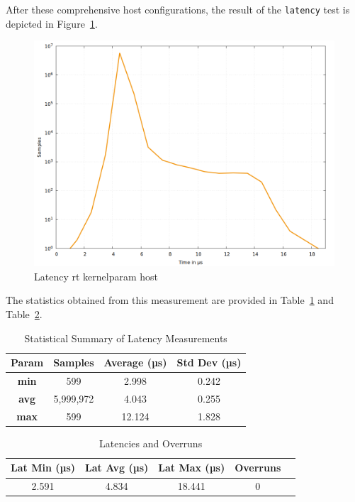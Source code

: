 \documentclass[MMR,Master,english]{twbook}
\begin{document}
\clearpage

\noindent After these comprehensive host configurations, the result of the \texttt{latency} test is depicted in Figure~\ref{fig:max_latency_rt_kernelparam_host}.

\begin{figure}[H]
	\centering
	\includegraphics[width=0.7\columnwidth]{masterthesis-documentation/docs/sigmatek/xenomai/5rt_kernelparam_host/gnuplot_max_latency_rt_kernelparam_host.png}
	\caption[Latency rt kernelparam host]{Latency rt kernelparam host}
	\label{fig:max_latency_rt_kernelparam_host}
\end{figure}

\noindent The statistics obtained from this measurement are provided in Table~\ref{tab:latency_stats_virt_host} and Table~\ref{tab:latency_overrun_msw_new_virt_host}.

\begin{table}[H]
	\centering
	\caption{Statistical Summary of Latency Measurements}
	\label{tab:latency_stats_virt_host}
	\begin{tabular}{|c|c|c|c|}
		\hline
		\textbf{Param} & \textbf{Samples} & \textbf{Average (µs)} & \textbf{Std Dev (µs)} \\ \hline
		\textbf{min}   & 599              & 2.998                 & 0.242                 \\ \hline
		\textbf{avg}   & 5,999,972        & 4.043                 & 0.255                 \\ \hline
		\textbf{max}   & 599              & 12.124                & 1.828                 \\ \hline
	\end{tabular}
\end{table}

\begin{table}[H]
	\centering
	\caption{Latencies and Overruns}
	\label{tab:latency_overrun_msw_new_virt_host}
	\begin{tabular}{|c|c|c|c|c|}
		\hline
		\textbf{Lat Min (µs)} & \textbf{Lat Avg (µs)} & \textbf{Lat Max (µs)} & \textbf{Overruns} \\ \hline
		2.591                 & 4.834                 & 18.441                & 0                 \\ \hline
	\end{tabular}
\end{table}
\end{document}

